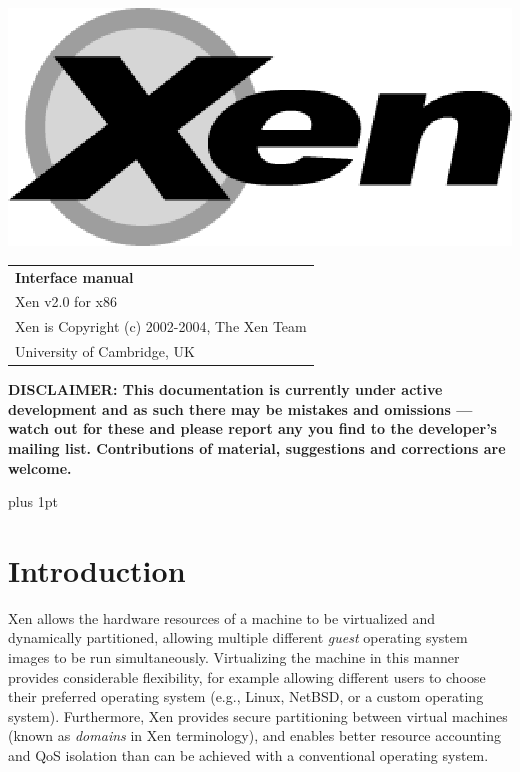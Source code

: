 \documentclass[11pt,twoside,final,openright]{report}
\begin{document}
\pagestyle{empty}
\begin{center}
\vspace*{\fill}
\includegraphics{figs/xenlogo.eps}
\vfill
\vfill
\vfill
\begin{tabular}{l}
{\Huge \bf Interface manual} \\[4mm]
{\huge Xen v2.0 for x86} \\[80mm]

{\Large Xen is Copyright (c) 2002-2004, The Xen Team} \\[3mm]
{\Large University of Cambridge, UK} \\[20mm]
\end{tabular}
\end{center}

{\bf
DISCLAIMER: This documentation is currently under active development
and as such there may be mistakes and omissions --- watch out for
these and please report any you find to the developer's mailing list.
Contributions of material, suggestions and corrections are welcome.
}

\vfill
\cleardoublepage

\pagestyle{plain}
{ \parskip 0pt plus 1pt
  \tableofcontents }
\cleardoublepage

\raggedbottom
{}
\parindent=0pt
\parskip=5pt
\renewcommand{\topfraction}{.8}
\renewcommand{\bottomfraction}{.8}
\renewcommand{\textfraction}{.2}
\renewcommand{\floatpagefraction}{.8}

\chapter{Introduction}

Xen allows the hardware resources of a machine to be virtualized and
dynamically partitioned, allowing multiple different {\em guest}
operating system images to be run simultaneously.  Virtualizing the
machine in this manner provides considerable flexibility, for example
allowing different users to choose their preferred operating system
(e.g., Linux, NetBSD, or a custom operating system).  Furthermore, Xen
provides secure partitioning between virtual machines (known as
{\em domains} in Xen terminology), and enables better resource
accounting and QoS isolation than can be achieved with a conventional
operating system. 
\end{document}
